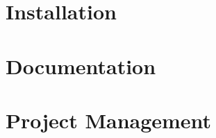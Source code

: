 \documentclass[a4paper, 12pt, oneside]{Main}  %
\begin{document}
\appendix %

\chapter{Installation}
\chapter{Documentation}
\chapter{Project Management}

\backmatter

\label{Bibliography}
\end{document}
